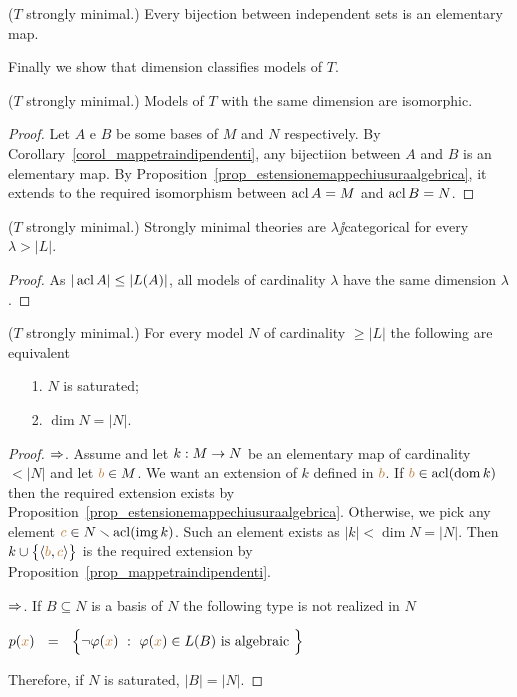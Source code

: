 \begin{corollary}\label{corol_mappetraindipendenti} 
($T$ strongly minimal.) Every bijection between independent sets is an elementary map.\QED
\end{corollary}

Finally we show that dimension classifies models of $T$.

\begin{theorem}
($T$ strongly minimal.) Models of $T$ with the same dimension are isomorphic.
\end{theorem}
\begin{proof}
Let $A$ e $B$ be some bases of $M$ and $N$ respectively.
By Corollary~\ref{corol_mappetraindipendenti}, any bijectiion between $A$ and $B$ is an elementary map.
By Proposition~\ref{prop_estensionemappechiusuraalgebrica}, it extends to the required isomorphism between $\mathop{\rm acl} A=M$ and $\mathop{\rm acl} B=N$.
\end{proof}

\begin{corollary} 
($T$ strongly minimal.) Strongly minimal theories are $\lambda\jj$categorical for every $\lambda>|L|$.
\end{corollary}
\begin{proof}
As $|\mathop{\rm acl} A|\le |L(A)|$, all models of cardinality $\lambda$ have the same dimension $\lambda$.
\end{proof}

\begin{proposition} 
($T$ strongly minimal.) For every model $N$ of cardinality $\ge|L|$ the following are equivalent
\begin{itemize}
\item[1.] $N$ is saturated;
\item[2.] $\dim N=|N|$.
\end{itemize}
\end{proposition}

\begin{proof}
$\Rightarrow$.
Assume  and let $k:M\rightarrow N$ be an elementary map of cardinality $<|N|$ and let ${\color{brown} b}\in M$.
We want an extension of $k$ defined in ${\color{brown} b}$.
If ${\color{brown} b}\in\mathop{\rm acl}(\mathop{\rm dom} k)$ then the required extension exists by Proposition~\ref{prop_estensionemappechiusuraalgebrica}.
Otherwise, we pick any element ${\color{brown} c}\in N\smallsetminus\mathop{\rm acl}(\mathop{\rm img} k)$.
Such an element exists as $|k|<\dim N=|N|$.
Then $k\cup\big\{\langle{\color{brown}b},{\color{brown} c}\rangle\big\}$ is the required extension by Proposition~\ref{prop_mappetraindipendenti}.

$\Rightarrow$.
If $B\subseteq N$ is a basis of $N$ the following type is not realized in $N$

\hfil $p({\color{brown} x})\ \ =\ \ \Big\{\neg\varphi({\color{brown} x})\ :\ \varphi({\color{brown} x})\in L(B)\textrm{ is algebraic }\Big\}$

Therefore, if $N$ is saturated, $|B|=|N|$.
\end{proof}

